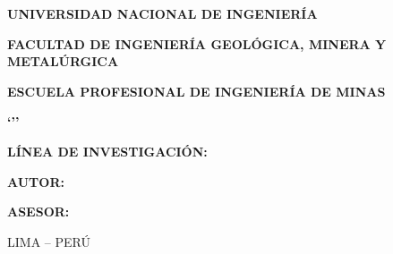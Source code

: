 \begin{titlepage}
    \centering
    {\bfseries\LARGE UNIVERSIDAD NACIONAL DE INGENIERÍA\par}
    \vspace{0.4cm}
    {\bfseries\large FACULTAD DE INGENIERÍA GEOLÓGICA, MINERA Y METALÚRGICA\par}
    \vspace{0.2cm}
    {\bfseries\large ESCUELA PROFESIONAL DE INGENIERÍA DE MINAS\par}
    \vspace{1.5cm}
    
    {\bfseries\Huge \MakeUppercase{\TipoDocumento}\par}
    \vspace{1.5cm}
    
    {\bfseries\Large `\MakeUppercase{\TituloTesis}''\par}
    \vspace{1.8cm}
    
    \textbf{\large LÍNEA DE INVESTIGACIÓN:}\\
    {\normalsize \LineaInvestigacion\par}
    \vspace{1.2cm}
    
    \textbf{\large AUTOR:}\\
    {\normalsize \NombreAutor\par}
    \vspace{0.8cm}
    
    \textbf{\large ASESOR:}\\
    {\normalsize \NombreAsesor\par}
    \vfill
    
    {\large LIMA -- PERÚ\par}
    {\large \AnioDocumento\par}
\end{titlepage}
